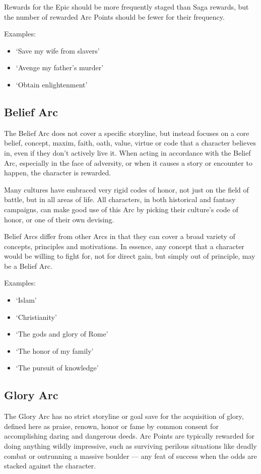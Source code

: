 \documentclass[oneside,11pt,english]{book}
\begin{document}
Rewards for the Epic should be more frequently staged than Saga rewards, but the
number of rewarded Arc Points should be fewer for their frequency.

Examples: 
\begin{itemize}
\item ‘Save my wife from slavers’ 
\item ‘Avenge my father’s murder’ 
\item ‘Obtain enlightenment’ 
\end{itemize}


\subsection{Belief Arc}
The Belief Arc does not cover a specific storyline, but instead focuses on a
core belief, concept, maxim, faith, oath, value, virtue or code that a character
believes in, even if they don’t actively live it. When acting in accordance with
the Belief Arc, especially in the face of adversity, or when it causes a story
or encounter to happen, the character is rewarded.

Many cultures have embraced very rigid codes of honor, not just on the field of
battle, but in all areas of life. All characters, in both historical and fantasy
campaigns, can make good use of this Arc by picking their culture’s code of
honor, or one of their own devising.


Belief Arcs differ from other Arcs in that they can cover a broad variety of
concepts, principles and motivations. In essence, any concept that a character
would be willing to fight for, not for direct gain, but simply out of principle,
may be a Belief Arc.

Examples: 
\begin{itemize}
\item ‘Islam’ 
\item ‘Christianity’ 
\item ‘The gods and glory of Rome’ 
\item ‘The honor of my family’ 
\item ‘The pursuit of knowledge’ 
\end{itemize}

\subsection{Glory Arc} 
The Glory Arc has no strict storyline or goal save for the acquisition of glory,
defined here as praise, renown, honor or fame by common consent for
accomplishing daring and dangerous deeds. Arc Points are typically rewarded for
doing anything wildly impressive, such as surviving perilous situations like
deadly combat or outrunning a massive boulder — any feat of success when the
odds are stacked against the character.
\end{document}
